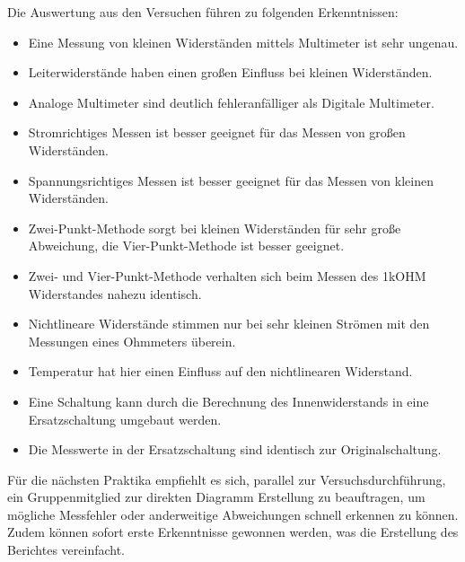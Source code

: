 \documentclass[a4paper, 11pt]{report}
\begin{document}
Die Auswertung aus den Versuchen führen zu folgenden Erkenntnissen:
\begin{itemize}
  \item Eine Messung von kleinen Widerständen mittels Multimeter ist sehr ungenau.
  \item Leiterwiderstände haben einen großen Einfluss bei kleinen Widerständen.
  \item Analoge Multimeter sind deutlich fehleranfälliger als Digitale Multimeter.
  \item Stromrichtiges Messen ist besser geeignet für das Messen von großen Widerständen.
  \item Spannungsrichtiges Messen ist besser geeignet für das Messen von kleinen Widerständen.
  \item Zwei-Punkt-Methode sorgt bei kleinen Widerständen für sehr große Abweichung, die Vier-Punkt-Methode ist besser geeignet.
  \item Zwei- und Vier-Punkt-Methode verhalten sich beim Messen des 1kOHM Widerstandes nahezu identisch.
  \item Nichtlineare Widerstände stimmen nur bei sehr kleinen Strömen mit den Messungen eines Ohmmeters überein.
  \item Temperatur hat hier einen Einfluss auf den nichtlinearen Widerstand.
  \item Eine Schaltung kann durch die Berechnung des Innenwiderstands in eine Ersatzschaltung umgebaut werden.
  \item Die Messwerte in der Ersatzschaltung sind identisch zur Originalschaltung.
\end{itemize}
Für die nächsten Praktika empfiehlt es sich, parallel zur Versuchsdurchführung, ein Gruppenmitglied zur direkten Diagramm Erstellung zu beauftragen, um mögliche Messfehler oder anderweitige Abweichungen schnell erkennen zu können.
Zudem können sofort erste Erkenntnisse gewonnen werden, was die Erstellung des Berichtes vereinfacht.


\end{document}
